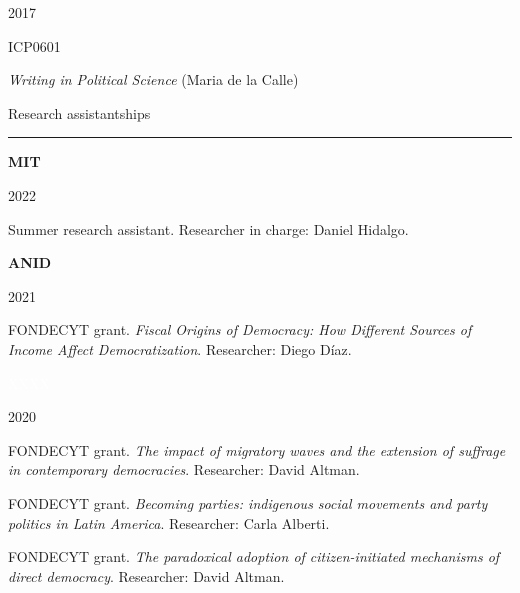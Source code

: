 \documentclass[a4paper, 12pt]{article}
\begin{document}
\begin{multicols}{3}

2017

\columnbreak

ICP0601

\columnbreak

\textit{Writing in Political Science} (Maria de la Calle)

\end{multicols}




\large Research assistantships
\smallskip
\hrule
\normalsize


\begin{multicols}{3}

\textbf{MIT}

\columnbreak

2022

\columnbreak

Summer research assistant. Researcher in charge: Daniel Hidalgo.

\end{multicols}


\begin{multicols}{3}

\textbf{ANID}

\columnbreak

2021

\columnbreak

FONDECYT grant. \textit{Fiscal Origins of Democracy: How Different Sources of Income Affect Democratization}. Researcher: Diego Díaz.

\end{multicols}


\begin{multicols}{3}

\textcolor{white}{XXXX}

\columnbreak

2020

\columnbreak

FONDECYT grant. \textit{The impact of migratory waves and the extension of suffrage in contemporary democracies}. Researcher: David Altman.

FONDECYT grant. \textit{Becoming parties: indigenous social movements and party politics in Latin America}. Researcher: Carla Alberti.

FONDECYT grant. \textit{The paradoxical adoption of citizen-initiated mechanisms of direct democracy}. Researcher: David Altman.

\end{multicols}
\end{document}
